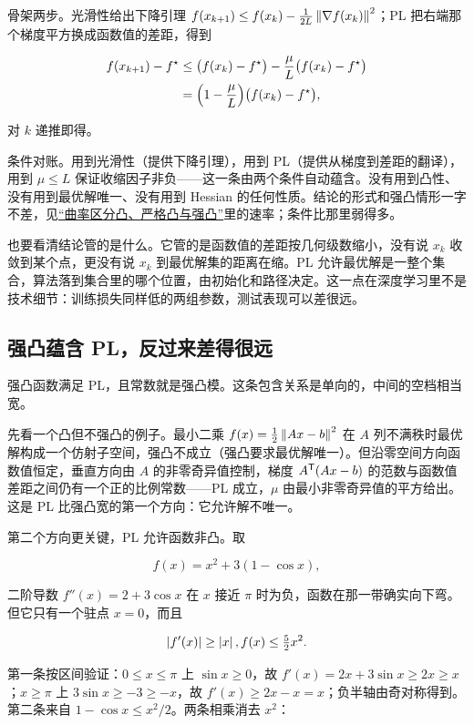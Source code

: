 骨架两步。光滑性给出下降引理 \(f(x_{k+1})\le f(x_k)-\tfrac1{2L}\left\lVert\nabla f(x_k)\right\rVert^2\)；PL 把右端那个梯度平方换成函数值的差距，得到

\[
\begin{aligned}
f(x_{k+1})-f^\star
&\le\bigl(f(x_k)-f^\star\bigr)-\frac{\mu}{L}\bigl(f(x_k)-f^\star\bigr)\\
&=\Bigl(1-\frac{\mu}{L}\Bigr)\bigl(f(x_k)-f^\star\bigr),
\end{aligned}
\]

对 \(k\) 递推即得。

条件对账。用到光滑性（提供下降引理），用到 PL（提供从梯度到差距的翻译），用到 \(\mu\le L\) 保证收缩因子非负——这一条由两个条件自动蕴含。没有用到凸性、没有用到最优解唯一、没有用到 Hessian 的任何性质。结论的形式和强凸情形一字不差，见\hyperref[sec:09-Convex-Optimization/03-Convex-Functions/03]{``曲率区分凸、严格凸与强凸''}里的速率；条件比那里弱得多。

也要看清结论管的是什么。它管的是函数值的差距按几何级数缩小，没有说 \(x_k\) 收敛到某个点，更没有说 \(x_k\) 到最优解集的距离在缩。PL 允许最优解是一整个集合，算法落到集合里的哪个位置，由初始化和路径决定。这一点在深度学习里不是技术细节：训练损失同样低的两组参数，测试表现可以差很远。

\subsection{强凸蕴含 PL，反过来差得很远}

强凸函数满足 PL，且常数就是强凸模。这条包含关系是单向的，中间的空档相当宽。

先看一个凸但不强凸的例子。最小二乘 \(f(x)=\tfrac12\left\lVert Ax-b\right\rVert^2\) 在 \(A\) 列不满秩时最优解构成一个仿射子空间，强凸不成立（强凸要求最优解唯一）。但沿零空间方向函数值恒定，垂直方向由 \(A\) 的非零奇异值控制，梯度 \(A^{\mathsf{T}}(Ax-b)\) 的范数与函数值差距之间仍有一个正的比例常数——PL 成立，\(\mu\) 由最小非零奇异值的平方给出。这是 PL 比强凸宽的第一个方向：它允许解不唯一。

第二个方向更关键，PL 允许函数非凸。取

\[
f(x)=x^2+3(1-\cos x),
\]

二阶导数 \(f''(x)=2+3\cos x\) 在 \(x\) 接近 \(\pi\) 时为负，函数在那一带确实向下弯。但它只有一个驻点 \(x=0\)，而且

\[
\left|f'(x)\right|\ge\left|x\right|,\space f(x)\le\tfrac52x^2 .
\]

第一条按区间验证：\(0\le x\le\pi\) 上 \(\sin x\ge0\)，故 \(f'(x)=2x+3\sin x\ge2x\ge x\)；\(x\ge\pi\) 上 \(3\sin x\ge-3\ge-x\)，故 \(f'(x)\ge2x-x=x\)；负半轴由奇对称得到。第二条来自 \(1-\cos x\le x^2/2\)。两条相乘消去 \(x^2\)：

